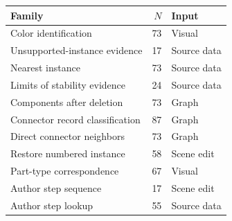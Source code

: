 \begin{tabular}{lrl}
\toprule
Family & $N$ & Input\\\midrule
Color identification & 73 & Visual\\
Unsupported-instance evidence & 17 & Source data\\
Nearest instance & 73 & Source data\\
Limits of stability evidence & 24 & Source data\\
Components after deletion & 73 & Graph\\
Connector record classification & 87 & Graph\\
Direct connector neighbors & 73 & Graph\\
Restore numbered instance & 58 & Scene edit\\
Part-type correspondence & 67 & Visual\\
Author step sequence & 17 & Scene edit\\
Author step lookup & 55 & Source data\\
\bottomrule
\end{tabular}
